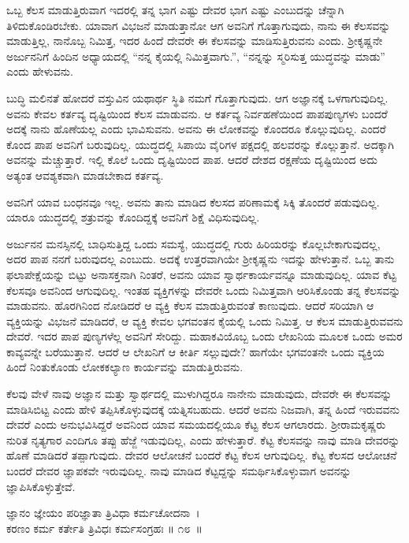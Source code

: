 ಒಬ್ಬ ಕೆಲಸ ಮಾಡುತ್ತಿರುವಾಗ ಇದರಲ್ಲಿ ತನ್ನ ಭಾಗ ಎಷ್ಟು ದೇವರ ಭಾಗ ಎಷ್ಟು ಎಂಬುದನ್ನು ಚೆನ್ನಾಗಿ ತಿಳಿದುಕೊಂಡಿರಬೇಕು. ಯಾವಾಗ ವಿಭಜನೆ ಮಾಡುತ್ತಾನೋ ಆಗ ಅವನಿಗೆ ಗೊತ್ತಾಗುವುದು, ನಾನು ಈ ಕೆಲಸವನ್ನು ಮಾಡುತ್ತಿಲ್ಲ, ನಾನೊಬ್ಬ ನಿಮಿತ್ತ, ಇದರ ಹಿಂದೆ ದೇವರೇ ಈ ಕೆಲಸವನ್ನು ಮಾಡಿಸುತ್ತಿರುವನು ಎಂದು. ಶ‍್ರೀಕೃಷ್ಣನೇ ಅರ್ಜುನನಿಗೆ ಹಿಂದಿನ ಅಧ್ಯಾಯದಲ್ಲಿ “ನನ್ನ ಕೈಯಲ್ಲಿ ನಿಮಿತ್ತವಾಗು.”, “ನನ್ನನ್ನು ಸ್ಮರಿಸುತ್ತ ಯುದ್ಧವನ್ನು ಮಾಡು” ಎಂದು ಹೇಳುವನು.

ಬುದ್ಧಿ ಮಲಿನತೆ ಹೋದರೆ ವಸ್ತುವಿನ ಯಥಾರ್ಥ ಸ್ಥಿತಿ ನಮಗೆ ಗೊತ್ತಾಗುವುದು. ಆಗ ಅಜ್ಞಾನಕ್ಕೆ ಒಳಗಾಗುವುದಿಲ್ಲ. ಅವನು ಕೇವಲ ಕರ್ತವ್ಯ ದೃಷ್ಟಿಯಿಂದ ಕೆಲಸ ಮಾಡುವನು. ಆ ಕರ್ತವ್ಯ ನಿರ್ವಹಣೆಯಿಂದ ಪಾಪಪುಣ್ಯಗಳು ಬಂದರೆ ಅದಕ್ಕೆ ನಾನು ಹೊಣೆಯಲ್ಲ ಎಂದು ಭಾವಿಸುವನು. ಅವನು ಈ ಲೋಕವನ್ನು ಕೊಂದರೂ ಕೊಲ್ಲುವುದಿಲ್ಲ. ಎಂದರೆ ಕೊಂದ ಪಾಪ ಅವನಿಗೆ ಬರುವುದಿಲ್ಲ. ಯುದ್ಧದಲ್ಲಿ ಸಿಪಾಯಿ ವೈರಿಗಳ ಪಕ್ಷದಲ್ಲಿ ಹಲವರನ್ನು ಕೊಲ್ಲುತ್ತಾನೆ. ಅದಕ್ಕಾಗಿ ಅವನನ್ನು ಮೆಚ್ಚುತ್ತಾರೆ. ಇಲ್ಲಿ ಕೊಲೆ ಒಂದು ದೃಷ್ಟಿಯಿಂದ ಪಾಪ. ಆದರೆ ದೇಶದ ರಕ್ಷಣೆಯ ದೃಷ್ಟಿಯಿಂದ ಅದು ಅತ್ಯಂತ ಆವಶ್ಯಕವಾಗಿ ಮಾಡಬೇಕಾದ ಕರ್ತವ್ಯ.

ಅವನಿಗೆ ಯಾವ ಬಂಧನವೂ ಇಲ್ಲ. ಅವನು ತಾನು ಮಾಡಿದ ಕೆಲಸದ ಪರಿಣಾಮಕ್ಕೆ ಸಿಕ್ಕಿ ತೊಂದರೆ ಪಡುವುದಿಲ್ಲ. ಯಾರೂ ಯುದ್ಧದಲ್ಲಿ ಶತ್ರುವನ್ನು ಕೊಂದಿದ್ದಕ್ಕೆ ಅವನಿಗೆ ಶಿಕ್ಷೆ ವಿಧಿಸುವುದಿಲ್ಲ.

ಅರ್ಜುನನ ಮನಸ್ಸಿನಲ್ಲಿ ಬಾಧಿಸುತ್ತಿದ್ದ ಒಂದು ಸಮಸ್ಯೆ, ಯುದ್ಧದಲ್ಲಿ ಗುರು ಹಿರಿಯರನ್ನು ಕೊಲ್ಲಬೇಕಾಗುವುದಲ್ಲ, ಅದರ ಪಾಪ ನನಗೆ ಬರುವುದಲ್ಲ ಎಂಬುದು. ಅದಕ್ಕೆ ಉತ್ತರವಾಗಿಯೇ ಶ‍್ರೀಕೃಷ್ಣನು ಇದನ್ನು ಹೇಳುತ್ತಾನೆ. ಒಬ್ಬ ತಾನು ಫಲಾಪೇಕ್ಷೆಯನ್ನು ಬಿಟ್ಟು ಅನಾಸಕ್ತನಾಗಿ ನಿಂತರೆ, ಅವನು ಯಾವ ಸ್ವಾರ್ಥಕಾರ್ಯವನ್ನೂ ಮಾಡುವುದಿಲ್ಲ. ಯಾವ ಕೆಟ್ಟ ಕೆಲಸವೂ ಅವನಿಂದ ಆಗುವುದಿಲ್ಲ. ಇಂತಹ ವ್ಯಕ್ತಿಗಳನ್ನು ದೇವರೇ ಒಂದು ನಿಮಿತ್ತವಾಗಿ ಆರಿಸಿಕೊಂಡು ತನ್ನ ಕೆಲಸವನ್ನು ಮಾಡುವನು. ಹೊರಗಿನಿಂದ ನೋಡಿದರೆ ಆ ವ್ಯಕ್ತಿ ಕೆಲಸ ಮಾಡುತ್ತಿರುವಂತೆ ಕಾಣುವುದು. ಆದರೆ ಸರಿಯಾಗಿ ಆ ವ್ಯಕ್ತಿಯನ್ನು ವಿಭಜನೆ ಮಾಡಿದರೆ, ಆ ವ್ಯಕ್ತಿ ಕೇವಲ ಭಗವಂತನ ಕೈಯಲ್ಲಿ ಒಂದು ನಿಮಿತ್ತ. ಆ ಕೆಲಸ ಮಾಡುತ್ತಿರುವವನು ದೇವರೆ. ಇದರ ಪಾಪ ಪುಣ್ಯಗಳೆಲ್ಲ ಅವನಿಗೆ ಸೇರಿದ್ದು. ಮಹಾಕವಿಯೊಬ್ಬ ಒಂದು ಲೇಖನಿಯ ಮೂಲಕ ಒಂದು ಅಮರ ಕಾವ್ಯವನ್ನೇ ಬರೆಯುತ್ತಾನೆ. ಆದರೆ ಆ ಲೇಖನಿಗೆ ಆ ಕೀರ್ತಿ ಸಲ್ಲುವುದೇ? ಹಾಗೆಯೇ ಭಗವಂತನೇ ಒಂದು ವ್ಯಕ್ತಿಯ ಹಿಂದೆ ನಿಂತುಕೊಂಡು ಲೋಕಕಲ್ಯಾಣ ಕಾರ್ಯವನ್ನು ಮಾಡುತ್ತಿರುವನು.\enginline{}

ಕೆಲವು ವೇಳೆ ನಾವು ಅಜ್ಞಾನ ಮತ್ತು ಸ್ವಾರ್ಥದಲ್ಲಿ ಮುಳುಗಿದ್ದರೂ ನಾನೇನು ಮಾಡುವುದು, ದೇವರೇ ಈ ಕೆಲಸವನ್ನು ಮಾಡಿಸಿಬಿಟ್ಟ ಎಂದು ಹೇಳಿ ತಪ್ಪಿಸಿಕೊಳ್ಳುವುದಕ್ಕೆ ಯತ್ನಿಸಬಹುದು. ಆದರೆ ಅವನು ನಿಜವಾಗಿ, ತನ್ನ ಹಿಂದೆ ಇರುವವನು ದೇವರೆ ಎಂದು ಅನುಭವಿಸಿದ್ದರೆ ಅವನಿಂದ ಯಾವ ಸಮಯದಲ್ಲಿಯೂ ಕೆಟ್ಟ ಕೆಲಸ ಆಗಲಾರದು. ಶ‍್ರೀರಾಮಕೃಷ್ಣರು ನುರಿತ ನೃತ್ಯಗಾರ ಎಂದಿಗೂ ತಪ್ಪು ಹೆಜ್ಜೆ ಇಡುವುದಿಲ್ಲ, ಎಂದು ಹೇಳುತ್ತಾರೆ. ಕೆಟ್ಟ ಕೆಲಸವನ್ನು ನಾವು ಮಾಡಿ ದೇವರನ್ನು ಹೊಣೆ ಮಾಡಿದರೆ ತಪ್ಪಾಗುವುದು. ದೇವರ ಆಲೋಚನೆ ಬಂದರೆ ಕೆಟ್ಟ ಕೆಲಸ ಆಗುವುದಿಲ್ಲ. ಕೆಟ್ಟ ಕೆಲಸದ ಆಲೋಚನೆ ಬಂದರೆ ದೇವರ ಜ್ಞಾಪಕವೇ ಇರುವುದಿಲ್ಲ. ನಾವು ಮಾಡಿದ ಕೆಟ್ಟದ್ದನ್ನು ಸಮರ್ಥಿಸಿಕೊಳ್ಳುವಾಗ ಅವನನ್ನು ಜ್ಞಾಪಿಸಿಕೊಳ್ಳುತ್ತೇವೆ.

\begin{shloka}
ಜ್ಞಾನಂ ಜ್ಞೇಯಂ ಪರಿಜ್ಞಾತಾ ತ್ರಿವಿಧಾ ಕರ್ಮಚೋದನಾ~। \\ಕರಣಂ ಕರ್ಮ ಕರ್ತೇತಿ ತ್ರಿವಿಧಃ ಕರ್ಮಸಂಗ್ರಹಃ \hfill॥ ೧೮~॥
\end{shloka}

